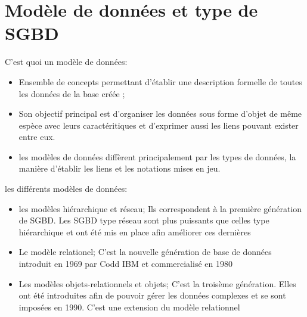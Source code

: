 \documentclass{beamer}
\begin{document}
\section{Mod\`ele de donn\'ees et type de SGBD}
\begin{frame}{C'est quoi un mod\`ele de donn\'ees:}
    \begin{itemize}
        \item Ensemble de concepts permettant d'\'etablir une description formelle de toutes les donn\'ees de la base cr\'e\'ee ;
        \item Son objectif principal est d'organiser les donn\'ees sous forme d'objet de m\^eme esp\`ece avec leurs caract\'eritiques et d'exprimer aussi les liens pouvant exister entre eux.
        \item les mod\`eles de donn\'ees diff\`erent principalement par les types de donn\'ees, la mani\`ere d'\'etablir les liens et les notations mises en jeu.
    \end{itemize}
\end{frame}
\begin{frame}{les diff\'erents mod\`eles de donn\'ees:}
    \begin{itemize}
        \item les mod\`eles hi\'erarchique et r\'eseau;
        \newline  Ils correspondent \`a la premi\`ere g\'en\'eration de SGBD.
        Les SGBD type r\'eseau sont plus puissants que celles type hi\'erarchique et ont \'et\'e mis en place afin am\'eliorer ces derni\`eres
        \item Le mod\`ele relationel;
        \newline C'est la nouvelle g\'en\'eration de base de donn\'ees introduit en 1969 par Codd IBM et commercialis\'e en 1980
        \item Les mod\`eles objets-relationnels et objets;
        \newline C'est la trois\`eme g\'en\'eration. Elles ont \'et\'e introduites afin de pouvoir g\'erer les donn\'ees complexes et se sont impos\'ees en 1990. C'est une extension du mod\`ele relationnel
       
    \end{itemize}
\end{frame}
\end{document}
